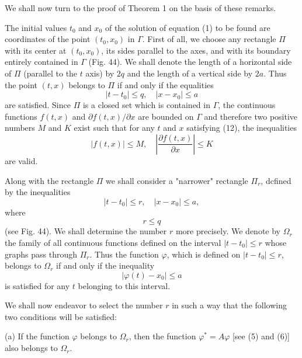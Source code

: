 \documentclass[10pt,a5paper]{book}
\makeatletter
\theoremstyle{plain}
\theoremstyle{definition}
\theoremstyle{remark}
\renewenvironment{proof}[1][\proofname]{\par
  \pushQED{\qed}%
  \normalfont\topsep6\p@\@plus6\p@\relax
  \trivlist
  \item\relax{\itshape #1\@addpunct{.}}\hspace\labelsep\ignorespaces
}{\popQED\endtrivlist\@endpefalse}
\makeatother
\begin{document}
We shall now turn to the proof of Theorem 1 on the basis of these remarks.

\begin{proof}[Proof of Theorem 1]
The initial values $t_{0}$ and $x_{0}$ of the solution of equation (1) to be found are coordinates of the point $\left(t_{0}, x_{0}\right)$ in $\Gamma$. First of all, we choose any rectangle $\Pi$ with its center at $\left(t_{0}, x_{0}\right)$, its sides parallel to the axes, and with its boundary entirely contained in $\Gamma$ (Fig. 44). We shall denote the length of a horizontal side of $\Pi$ (parallel to the $t$ axis) by $2 q$ and the length of a vertical side by $2 a$. Thus the point $(t, x)$ belongs to $\Pi$ if and only if the equalities
\begin{equation*}
\left|t-t_{0}\right| \leq q, \quad\left|x-x_{0}\right| \leq a \tag{12}
\end{equation*}
are satisfied. Since $\Pi$ is a closed set which is contained in $\Gamma$, the continuous functions $f(t, x)$ and $\partial f(t, x) / \partial x$ are bounded on $\Gamma$ and therefore two positive numbers $M$ and $K$ exist such that for any $t$ and $x$ satisfying (12), the inequalities
\begin{equation*}
|f(t, x)| \leq M, \quad\left|\frac{\partial f(t, x)}{\partial x}\right| \leq K \tag{13}
\end{equation*}
are valid.

Along with the rectangle $\Pi$ we shall consider a "narrower" rectangle $\Pi_{r}$, dcfined by the inequalities
\[
\left|t-t_{0}\right| \leq r, \quad\left|x-x_{0}\right| \leq a,
\]
where
\begin{equation*}
r \leq q \tag{14}
\end{equation*}
(see Fig. 44). We shall determine the number $r$ more precisely. We denote by $\Omega_{r}$ the family of all continuous functions defined on the interval $\left|t-t_{0}\right| \leq r$ whose graphs pass through $\Pi_{r}$. Thus the function $\varphi$, which is defined on $\left|t-t_{0}\right| \leq r$, belongs to $\Omega_{r}$ if and only if the inequality
\begin{equation*}
\left|\varphi(t)-x_{0}\right| \leq a \tag{15}
\end{equation*}
is satisfied for any $t$ belonging to this interval.

We shall now endeavor to select the number $r$ in such a way that the following two conditions will be satisfied:

(a) If the function $\varphi$ belongs to $\Omega_{r}$, then the function $\varphi^{*}=A \varphi$ [see (5) and (6)] also belongs to $\Omega_{r}$.


\end{proof}
\end{document}
